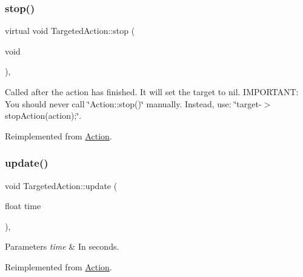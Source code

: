\mbox{\label{classTargetedAction_a006f4ba95607369684770186588d12ce}} 
\subsubsection{\texorpdfstring{stop()}{stop()}\hspace{0.1cm}{\footnotesize\ttfamily [2/2]}}
{\footnotesize\ttfamily virtual void Targeted\+Action\+::stop (\begin{DoxyParamCaption}\item[{void}]{ }\end{DoxyParamCaption})\hspace{0.3cm}{\ttfamily [override]}, {\ttfamily [virtual]}}

Called after the action has finished. It will set the \textquotesingle{}target\textquotesingle{} to nil. I\+M\+P\+O\+R\+T\+A\+NT\+: You should never call \char`\"{}\+Action\+::stop()\char`\"{} manually. Instead, use\+: \char`\"{}target-\/$>$stop\+Action(action);\char`\"{}. 

Reimplemented from \hyperlink{classAction_a968267fa7a1dcc46a2976249a712d3c8}{Action}.

\mbox{\label{classTargetedAction_a031468e095f1c4693a5e265664f7c337}} 
\subsubsection{\texorpdfstring{update()}{update()}\hspace{0.1cm}{\footnotesize\ttfamily [1/2]}}
{\footnotesize\ttfamily void Targeted\+Action\+::update (\begin{DoxyParamCaption}\item[{float}]{time }\end{DoxyParamCaption})\hspace{0.3cm}{\ttfamily [override]}, {\ttfamily [virtual]}}


\begin{DoxyParams}{Parameters}
{\em time} & In seconds. \\
\hline
\end{DoxyParams}


Reimplemented from \hyperlink{classAction_a937e646e63915e33ad05ba149bfcf239}{Action}.

